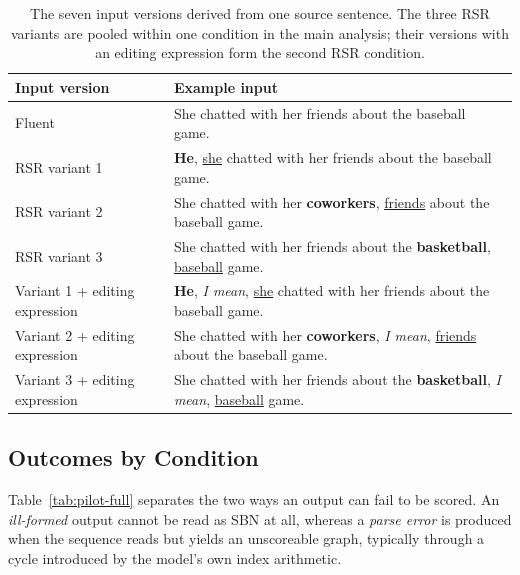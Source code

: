\begin{table}[ht]
\centering
\small
\begin{tabular}{@{}l>{\raggedright\arraybackslash}p{}@{}}
\toprule
\textbf{Input version} & \textbf{Example input} \\
\midrule
Fluent
  & She chatted with her friends about the baseball game. \\
RSR variant 1
  & \textbf{He}, \underline{she} chatted with her friends about the baseball
    game. \\
RSR variant 2
  & She chatted with her \textbf{coworkers}, \underline{friends} about the
    baseball game. \\
RSR variant 3
  & She chatted with her friends about the \textbf{basketball},
    \underline{baseball} game. \\
Variant 1 + editing expression
  & \textbf{He}, \textit{I mean}, \underline{she} chatted with her friends
    about the baseball game. \\
Variant 2 + editing expression
  & She chatted with her \textbf{coworkers}, \textit{I mean},
    \underline{friends} about the baseball game. \\
Variant 3 + editing expression
  & She chatted with her friends about the \textbf{basketball},
    \textit{I mean}, \underline{baseball} game. \\
\bottomrule
\end{tabular}
\caption{The seven input versions derived from one source sentence. The three
RSR variants are pooled within one condition in the main analysis; their
versions with an editing expression form the second RSR condition.}
\label{tab:pilot-input-conditions}
\end{table}

\subsection{Outcomes by Condition}

Table~\ref{tab:pilot-full} separates the two ways an output can fail to be
scored. An \emph{ill-formed} output cannot be read as SBN at all, whereas a
\emph{parse error} is produced when the sequence reads but yields an
unscoreable graph, typically through a cycle introduced by the model's own
index arithmetic.

